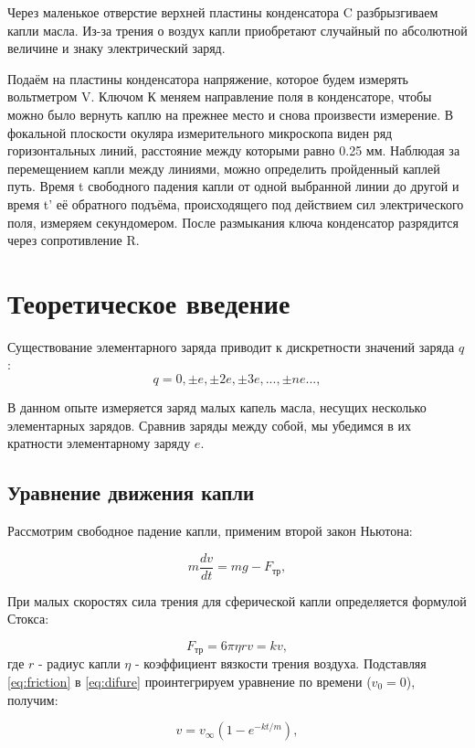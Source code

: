 \documentclass{lab}
\begin{document}
Через маленькое отверстие верхней пластины конденсатора C разбрызгиваем капли масла. Из-за трения о воздух капли приобретают случайный по абсолютной величине и знаку электрический заряд.

Подаём на пластины конденсатора напряжение, которое будем измерять вольтметром V. Ключом К меняем направление поля в конденсаторе, чтобы можно было вернуть каплю на прежнее место и снова произвести измерение. В фокальной плоскости окуляра измерительного микроскопа виден ряд горизонтальных линий, расстояние между которыми равно 0.25 мм. Наблюдая за перемещением капли между линиями, можно определить пройденный каплей путь. Время t свободного падения капли от одной выбранной линии до другой и время t' её обратного подъёма, происходящего под действием сил электрического поля, измеряем секундомером. После размыкания ключа конденсатор разрядится через сопротивление R.
\newpage
\section{Теоретическое введение}
Существование элементарного заряда приводит к дискретности значений заряда $q$:
\begin{equation}
	q = 0, \pm e, \pm 2e, \pm 3e, ..., \pm ne ...,
\end{equation}

В данном опыте измеряется заряд малых капель масла, несущих несколько элементарных зарядов. Сравнив заряды между собой, мы убедимся в их кратности элементарному заряду $e$.
\subsection{Уравнение движения капли}
Рассмотрим свободное падение капли, применим второй закон Ньютона:

\begin{equation}
	m\frac{dv}{dt} = mg - F_{\text{тр}},
	\label{eq:difure}
\end{equation}

При малых скоростях сила трения для сферической капли определяется формулой Стокса:

\begin{equation}
	F_{\text{тр}} = 6\pi\eta r v = kv,
	\label{eq:friction}
\end{equation}
где $r$ - радиус капли $\eta$ - коэффициент вязкости трения воздуха.
Подставляя \eqref{eq:friction} в \eqref{eq:difure} проинтегрируем уравнение по времени ($v_{0} = 0$), получим:

\begin{equation}
	v = v_{\infty}(1 - e^{-kt/m}),
	\label{eq:speed_inf}
\end{equation}
\end{document}
